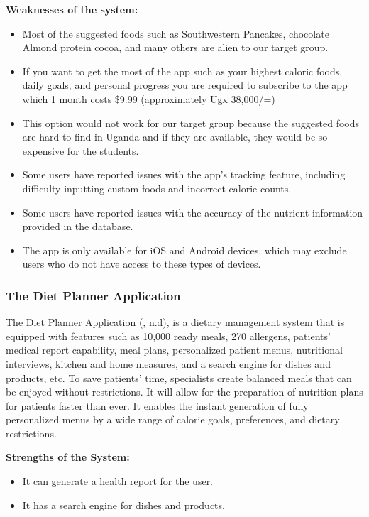 \documentclass{article}
\begin{document}
\textbf{Weaknesses of the system:}
\begin{itemize}
\item Most of the suggested foods such as Southwestern Pancakes, chocolate Almond protein cocoa, and many others are alien to our target group.
\item If you want to get the most of the app such as your highest caloric foods, daily goals, and personal progress you are required to subscribe to the app which 1 month costs \$9.99 (approximately Ugx 38,000/=)
\item This option would not work for our target group because the suggested foods are hard to find in Uganda and if they are available, they would be so expensive for the students.

\item Some users have reported issues with the app's tracking feature, including difficulty inputting custom foods and incorrect calorie counts.
\item Some users have reported issues with the accuracy of the nutrient information provided in the database.
\item The app is only available for iOS and Android devices, which may exclude users who do not have access to these types of devices.

\end{itemize}

\subsubsection{The Diet Planner Application}

The Diet Planner Application (, n.d), is a dietary management system that is equipped with features such as 10,000 ready meals, 270 allergens, patients' medical report capability, meal plans, personalized patient menus, nutritional interviews, kitchen and home measures, and a search engine for dishes and products, etc. To save patients' time, specialists create balanced meals that can be enjoyed without restrictions. It will allow for the preparation of nutrition plans for patients faster than ever. It enables the instant generation of fully personalized menus by a wide range of calorie goals, preferences, and dietary restrictions.

\textbf{Strengths of the System:}
\begin{itemize}
\item It can generate a health report for the user.
\item It has a search engine for dishes and products.
\end{itemize}
\end{document}
